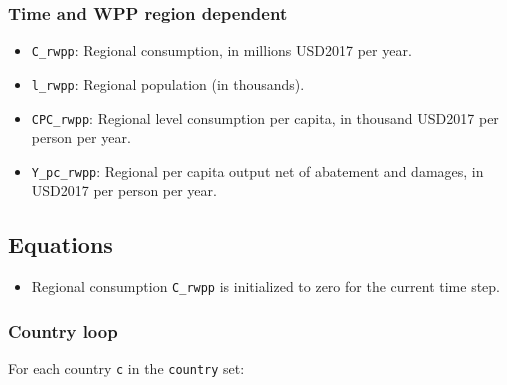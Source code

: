 \documentclass[
]{article}
\providecommand{\tightlist}{%
  \setlength{\itemsep}{0pt}\setlength{\parskip}{0pt}}
\begin{document}
\subsubsection{Time and WPP region dependent}\label{time-and-region-dependent}

\begin{itemize}
\tightlist
\item
  \texttt{C\_rwpp}: Regional consumption, in millions USD2017 per year.
\item
  \texttt{l\_rwpp}: Regional population (in thousands).
\item
  \texttt{CPC\_rwpp}: Regional level consumption per capita, in thousand
  USD2017 per person per year.
\item
  \texttt{Y\_pc\_rwpp}: Regional per capita output net of abatement and
  damages, in USD2017 per person per year.
\end{itemize}

\subsection{Equations}\label{equations-4}

\begin{itemize}
\tightlist
\item
  Regional consumption \texttt{C\_rwpp} is initialized to zero for the
  current time step.
\end{itemize}

\subsubsection{Country loop}\label{country-loop}

For each country \texttt{c} in the \texttt{country} set:
\end{document}

